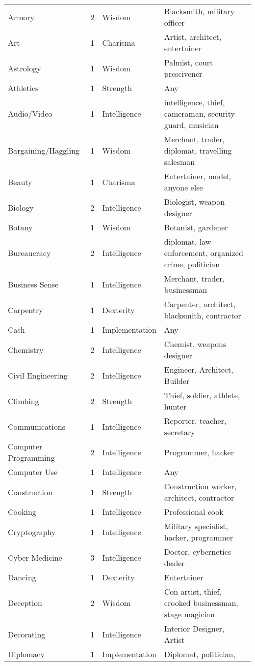 \documentclass[twoside]{book}
\begin{document}
\begin{longtable}{p{1.25in}llp{12em}}
      \raggedright  Armory& 2& Wisdom& Blacksmith, military
           officer\tabularnewline
      \raggedright  Art& 1& Charisma& Artist, architect,
           entertainer\tabularnewline
      \raggedright  Astrology& 1& Wisdom& Palmist, court
           prescivener\tabularnewline
      \raggedright  Athletics& 1& Strength& Any\tabularnewline
      \raggedright  Audio/Video& 1& Intelligence& intelligence, thief,
           cameraman, security guard, musician\tabularnewline
      \raggedright  Bargaining/Haggling& 1& Wisdom& Merchant, trader,
           diplomat, travelling salesman\tabularnewline
      \raggedright  Beauty& 1& Charisma& Entertainer, model,
           anyone else\tabularnewline
      \raggedright  Biology& 2& Intelligence& Biologist, weapon
           designer\tabularnewline
      \raggedright  Botany& 1& Wisdom& Botanist, gardener\tabularnewline
      \raggedright  Bureaucracy& 2& Intelligence& diplomat, law
           enforcement, organized crime, politician\tabularnewline
      \raggedright  Business Sense& 1& Intelligence& Merchant, trader,
           businessman\tabularnewline
      \raggedright  Carpentry& 1& Dexterity& Carpenter, architect,
           blacksmith, contractor\tabularnewline
      \raggedright  Cash& 1& Implementation& Any\tabularnewline
      \raggedright  Chemistry& 2& Intelligence& Chemist, weapons designer\tabularnewline
      \raggedright  Civil Engineering& 2& Intelligence& Engineer, Architect,
           Builder\tabularnewline
      \raggedright  Climbing& 2& Strength& Thief, soldier, athlete,
           hunter\tabularnewline
      \raggedright  Communications& 1& Intelligence& Reporter, teacher,
           secretary\tabularnewline
      \raggedright  Computer Programming& 2& Intelligence& Programmer, hacker\tabularnewline
      \raggedright  Computer Use& 1& Intelligence& Any\tabularnewline
      \raggedright  Construction& 1& Strength& Construction worker,
           architect, contractor\tabularnewline
      \raggedright  Cooking& 1& Intelligence& Professional cook\tabularnewline
      \raggedright  Cryptography& 1& Intelligence& Military specialist,
           hacker, programmer\tabularnewline
      \raggedright  Cyber Medicine& 3& Intelligence& Doctor, cybernetics
           dealer\tabularnewline
      \raggedright  Dancing& 1& Dexterity& Entertainer\tabularnewline
      \raggedright  Deception& 2& Wisdom& Con artist, thief,
           crooked businessman, stage magician\tabularnewline
      \raggedright  Decorating& 1& Intelligence& Interior Designer, Artist\tabularnewline
      \raggedright  Diplomacy& 1& Implementation& Diplomat, politician,

\end{longtable}
\end{document}

